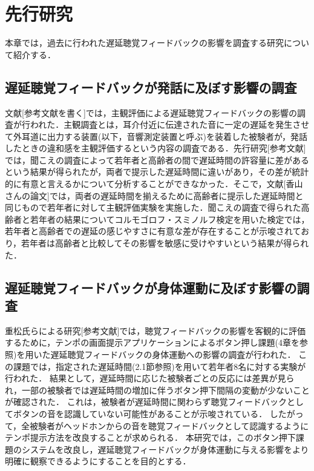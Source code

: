 \chapter{先行研究}
本章では，過去に行われた遅延聴覚フィードバックの影響を調査する研究について紹介する．
\section{遅延聴覚フィードバックが発話に及ぼす影響の調査}
文献[参考文献を書く]では，主観評価による遅延聴覚フィードバックの影響の調査が行われた．主観調査とは，耳介付近に伝達された音に一定の遅延を発生させて外耳道に出力する装置(以下，音響測定装置と呼ぶ)を装着した被験者が，発話したときの違和感を主観評価するという内容の調査である．先行研究[参考文献]では，聞こえの調査によって若年者と高齢者の間で遅延時間の許容量に差があるという結果が得られたが，両者で提示した遅延時間に違いがあり，その差が統計的に有意と言えるかについて分析することができなかった．そこで，文献[香山さんの論文]では，両者の遅延時間を揃えるために高齢者に提示した遅延時間と同じもので若年者に対して主観評価実験を実施した．聞こえの調査で得られた高齢者と若年者の結果についてコルモゴロフ・スミノルフ検定を用いた検定では，若年者と高齢者での遅延の感じやすさに有意な差が存在することが示唆されており，若年者は高齢者と比較してその影響を敏感に受けやすいという結果が得られた．
\section{遅延聴覚フィードバックが身体運動に及ぼす影響の調査}
重松氏らによる研究[参考文献]では，聴覚フィードバックの影響を客観的に評価するために，テンポの画面提示アプリケーションによるボタン押し課題(4章を参照)を用いた遅延聴覚フィードバックの身体運動への影響の調査が行われた．
この課題では，指定された遅延時間(2.1節参照)を用いて若年者8名に対する実験が行われた．
結果として，遅延時間に応じた被験者ごとの反応には差異が見られ，一部の被験者では遅延時間の増加に伴うボタン押下間隔の変動が少ないことが確認された．
これは，被験者が遅延時間に関わらず聴覚フィードバックとしてボタンの音を認識していない可能性があることが示唆されている．
したがって，全被験者がヘッドホンからの音を聴覚フィードバックとして認識するようにテンポ提示方法を改良することが求められる．
本研究では，このボタン押下課題のシステムを改良し，遅延聴覚フィードバックが身体運動に与える影響をより明確に観察できるようにすることを目的とする．
